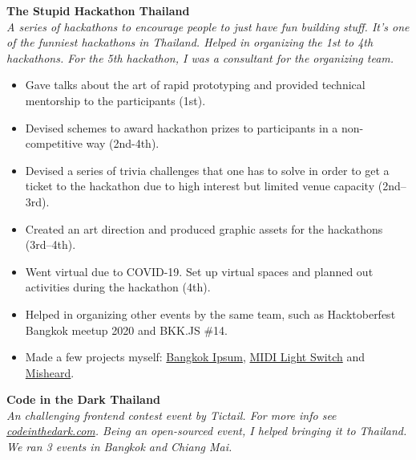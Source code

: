 \documentclass[a4paper]{article}
\begin{document}
\vspace{2mm}

\textbf{The Stupid Hackathon Thailand}\\
\textit{A series of hackathons to encourage people to just have fun building stuff. It’s one of the funniest hackathons in Thailand. Helped in organizing the 1st to 4th hackathons. For the 5th hackathon, I was a consultant for the organizing team.}

\begin{itemize} \itemsep 1pt
    
	\item Gave talks about the art of rapid prototyping and provided technical mentorship to the participants (1st).
    
	\item Devised schemes to award hackathon prizes to participants in a non-competitive way (2nd-4th).
    
	\item Devised a series of trivia challenges that one has to solve in order to get a ticket to the hackathon due to high interest but limited venue capacity (2nd–3rd).
    
	\item Created an art direction and produced graphic assets for the hackathons (3rd–4th).
    
	\item Went virtual due to COVID-19. Set up virtual spaces and planned out activities during the hackathon (4th).
    
	\item Helped in organizing other events by the same team, such as Hacktoberfest Bangkok meetup 2020 and BKK.JS \#14.
    
	\item Made a few projects myself: \href{https://dt.in.th/bangkokipsum.html}{Bangkok Ipsum}, \href{https://dt.in.th/midi-light-switch.html}{MIDI Light Switch} and \href{https://www.youtube.com/watch?v=2JE3DETHTQo}{Misheard}.
    
\end{itemize}

\vspace{2mm}

\textbf{Code in the Dark Thailand}\\
\textit{An challenging frontend contest event by Tictail. For more info see \href{http://codeinthedark.com/}{codeinthedark.com}. Being an open-sourced event, I helped bringing it to Thailand. We ran 3 events in Bangkok and Chiang Mai.}
\end{document}
